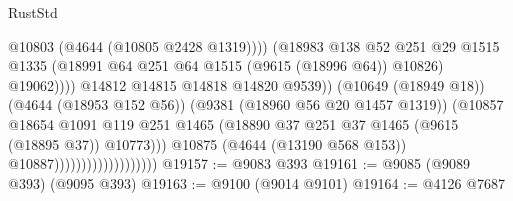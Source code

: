 \begin{lexlean}{RustStd}
\begin{coremodule}
                                                          @10803
                                                          (@4644 (@10805 @2428 @1319))))
                                                      (@18983
                                                        @138
                                                        @52
                                                        @251
                                                        @29
                                                        @1515
                                                        @1335
                                                        (@18991
                                                          @64
                                                          @251
                                                          @64
                                                          @1515
                                                          (@9615 (@18996 @64))
                                                          @10826)
                                                        @19062))))
                                                @14812
                                                @14815
                                                @14818
                                                @14820
                                                @9539))
                                            (@10649 (@18949 @18))
                                            (@4644 (@18953 @152 @56))
                                            (@9381 (@18960 @56 @20 @1457 @1319))
                                            (@10857
                                              @18654
                                              @1091
                                              @119
                                              @251
                                              @1465
                                              (@18890
                                                @37
                                                @251
                                                @37
                                                @1465
                                                (@9615 (@18895 @37))
                                                @10773)))
                                          @10875
                                          (@4644 (@13190 @568 @153))
                                          @10887)))))))))))))))))))
@19157 := @9083 @393
@19161 := @9085 (@9089 @393) (@9095 @393)
@19163 := @9100 (@9014 @9101)
@19164 := @4126 @7687

\end{coremodule}
\end{lexlean}

